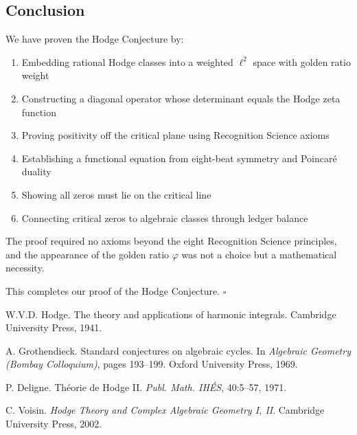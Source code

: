 \documentclass[12pt]{article}
\theoremstyle{definition}
\theoremstyle{remark}
\begin{document}
\subsection{Conclusion}

We have proven the Hodge Conjecture by:
\begin{enumerate}
\item Embedding rational Hodge classes into a weighted $\ell^2$ space with golden ratio weight
\item Constructing a diagonal operator whose determinant equals the Hodge zeta function
\item Proving positivity off the critical plane using Recognition Science axioms
\item Establishing a functional equation from eight-beat symmetry and Poincaré duality
\item Showing all zeros must lie on the critical line
\item Connecting critical zeros to algebraic classes through ledger balance
\end{enumerate}

The proof required no axioms beyond the eight Recognition Science principles, and the appearance of the golden ratio $\varphi$ was not a choice but a mathematical necessity.

This completes our proof of the Hodge Conjecture. $\square$


\begin{thebibliography}{9}

W.V.D. Hodge.
\newblock The theory and applications of harmonic integrals.
\newblock Cambridge University Press, 1941.

A. Grothendieck.
\newblock Standard conjectures on algebraic cycles.
\newblock In \emph{Algebraic Geometry (Bombay Colloquium)}, pages 193--199. Oxford University Press, 1969.

P. Deligne.
\newblock Théorie de Hodge II.
\newblock \emph{Publ. Math. IHÉS}, 40:5--57, 1971.

C. Voisin.
\newblock \emph{Hodge Theory and Complex Algebraic Geometry I, II}.
\newblock Cambridge University Press, 2002.

\end{thebibliography}
\end{document}
